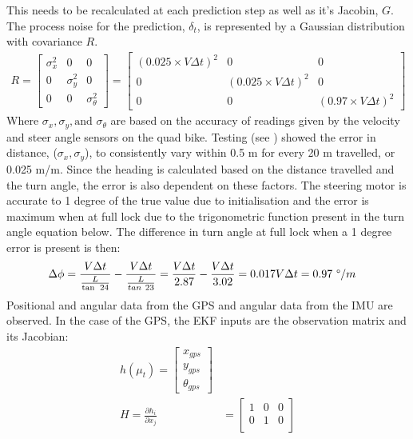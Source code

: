 \documentclass[main.tex]{subfiles}
\begin{document}
\begin{appendices}
This needs to be recalculated at each prediction step as well as it's Jacobin, $G$. The process noise for the prediction, $\delta_t$, is represented by a Gaussian distribution with covariance $R$.
\begin{align}
R =
\begin{bmatrix}
    \sigma_x^2	&	0	&	0\\
    0	&	\sigma_y^2	&	0\\
    0	&	0	&	\sigma_\theta^2
\end{bmatrix}
=
\begin{bmatrix}
    (0.025 \times V\Delta t)^2	&	0	&	0\\
    0	&	(0.025 \times V\Delta t)^2	&	0\\
    0	&	0	&	(0.97 \times V\Delta t)^2
\end{bmatrix}
\end{align}
Where $\sigma_x, \sigma_y, \textrm{and } \sigma_\theta$ are based on the accuracy of readings given by the velocity and steer angle sensors on the quad bike. Testing (see ) showed the error in distance, ($\sigma_x, \sigma_y$), to consistently vary within 0.5 m for every 20 m travelled, or 0.025 m/m. Since the heading is calculated based on the distance travelled and the turn angle, the error is also dependent on these factors. The steering motor is accurate to 1 degree of the true value due to initialisation and the error is maximum when at full lock due to the trigonometric function present in the turn angle equation below. The difference in turn angle at full lock when a 1 degree error is present is then:
\begin{align}
&\Delta\phi = \frac{V\Delta t}{\frac{L}{\tan\ 24}} - \frac{V\Delta t}{\frac{L}{tan\ 23}} = \frac{V\Delta t}{2.87} - \frac{V\Delta t}{3.02} = 0.017V\Delta t = 0.97\ \degree/m
\end{align}
Positional and angular data from the GPS and angular data from the IMU are observed. In the case of the GPS, the EKF inputs are the observation matrix and its Jacobian:
\begin{align}
h(\mu_t) = 
\begin{bmatrix}
    x_{gps}\\
    y_{gps}\\
    \theta_{gps}
\end{bmatrix}\\
H = \frac{\partial h_i}{\partial x_j} &= 
\begin{bmatrix}
    1	&	0	&	0\\
    0	&	1	&	0\\

\end{bmatrix}
\end{align}
\end{appendices}
\end{document}

